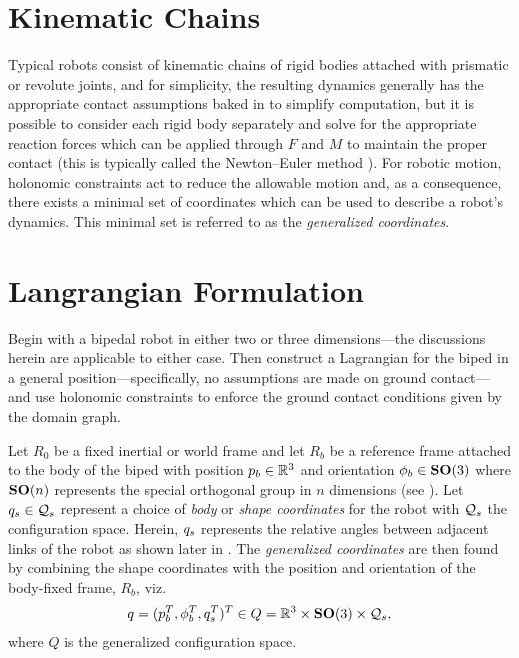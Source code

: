 \section{Kinematic Chains}

Typical robots consist of kinematic chains of rigid bodies attached with prismatic or revolute joints, and for simplicity, the resulting dynamics generally has the appropriate contact assumptions baked in to simplify computation, but it is possible to consider each rigid body separately and solve for the appropriate reaction forces which can be applied through $F$ and $M$ to maintain the proper contact (this is typically called the Newton--Euler method \cite{Hollerbach1980}).
%
For robotic motion, holonomic constraints act to reduce the allowable motion and, as a consequence, there exists a minimal set of coordinates which can be used to describe a robot's dynamics.
%
This minimal set is referred to as the {\em generalized coordinates}.


\section{Langrangian Formulation}

%
%


Begin with a bipedal robot in either two or three dimensions---the discussions herein are applicable to either case.
%
Then construct a Lagrangian for the biped in a general position---specifically, no assumptions are made on ground contact---and use holonomic constraints to enforce the ground contact conditions given by the domain graph.

Let $R_{0}$ be a fixed inertial or world frame and let $R_{b}$ be a reference frame attached to the body of the biped with position $p_{b} \in \mathbb{R}^{3}$ and orientation $\phi_{b} \in \mathbf{SO}(3)$ where $\mathbf{SO}(n)$ represents the special orthogonal group in $n$ dimensions (see \cite{Conway1985}).
%
Let $q_{s} \in \mathcal{Q}_{s}$ represent a choice of {\em body} or {\em shape coordinates} for the robot with $\mathcal{Q}_{s}$ the configuration space.
%
Herein, $q_{s}$ represents the relative angles between adjacent links of the robot as shown later in .
%
The {\em generalized coordinates} are then found by combining the shape coordinates with the position and orientation of the body-fixed frame, $R_{b}$, viz.
%
\begin{align}
  q = (p_{b}^{T}, \phi_{b}^{T}, q_{s}^{T})^{T} \in Q = \mathbb{R}^{3} \times \mathbf{SO}(3) \times \mathcal{Q}_{s},
\end{align}
%
where $Q$ is the generalized configuration space.

